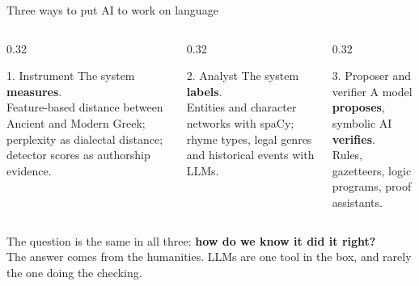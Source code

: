 \documentclass[aspectratio=169, 10pt]{beamer}
\newcommand{\hl}[1]{\textcolor{terracotta}{\textbf{#1}}}
\begin{document}
\begin{frame}{Three ways to put AI to work on language}
  \small
  \begin{columns}[T]
    \begin{column}{0.32\textwidth}
      \begin{block}{1. Instrument}
        The system \textbf{measures}.\\[2pt]
        Feature-based distance between Ancient and Modern Greek; perplexity as dialectal distance; detector scores as authorship evidence.
      \end{block}
    \end{column}
    \begin{column}{0.32\textwidth}
      \begin{block}{2. Analyst}
        The system \textbf{labels}.\\[2pt]
        Entities and character networks with spaCy; rhyme types, legal genres and historical events with LLMs.
      \end{block}
    \end{column}
    \begin{column}{0.32\textwidth}
      \begin{block}{3. Proposer and verifier}
        A model \textbf{proposes}, symbolic AI \textbf{verifies}.\\[2pt]
        Rules, gazetteers, logic programs, proof assistants.
      \end{block}
    \end{column}
  \end{columns}
  \vspace{1em}
  \centering
  \Large The question is the same in all three: \hl{how do we know it did it right?}\\[4pt]
  \normalsize The answer comes from the humanities. LLMs are one tool in the box, and rarely the one doing the checking.
\end{frame}
\end{document}
